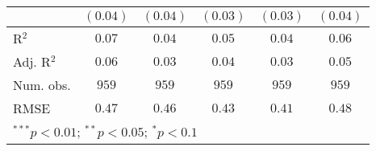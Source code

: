 \begin{table}
\begin{center}
\begin{tabular}{l c c c c c}
              & $(0.04)$     & $(0.04)$     & $(0.03)$     & $(0.03)$      & $(0.04)$      \\
\midrule
R$^2$         & $0.07$       & $0.04$       & $0.05$       & $0.04$        & $0.06$        \\
Adj. R$^2$    & $0.06$       & $0.03$       & $0.04$       & $0.03$        & $0.05$        \\
Num. obs.     & $959$        & $959$        & $959$        & $959$         & $959$         \\
RMSE          & $0.47$       & $0.46$       & $0.43$       & $0.41$        & $0.48$        \\
\bottomrule
\multicolumn{6}{l}{\scriptsize{$^{***}p<0.01$; $^{**}p<0.05$; $^{*}p<0.1$}}
\end{tabular}
\label{tab_emo_asyl}
\end{center}
\end{table}
